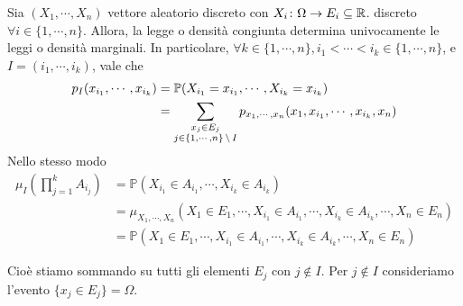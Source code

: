 \documentclass[a4paper]{article}
\begin{document}
\begin{snippetproposition}{}
    Sia \((X_1, \cdots, X_n)\)
    vettore aleatorio discreto con \(X_i \colon \Omega \to E_i \subseteq \mathbb{R}\).
    discreto \(\forall i \in \{1, \cdots, n\}\).
    Allora, la legge o densità congiunta determina univocamente
    le leggi o densità marginali.
    In particolare, \(\forall k \in \{1, \cdots, n\}, i_1 < \cdots < i_k \in \{1, \cdots, n\}\),
    e \(I = (i_1, \cdots, i_k)\),
    vale che
    \begin{align*}
        p_I(x_{i_1}, \cdots, x_{i_k})
        &= \mathbb P(X_{i_1} = x_{i_1}, \cdots, X_{i_k} = x_{i_k}) \\
        &= \sum_{\substack{x_j \in E_j \\ j \in \{1, \cdots, n\} \,\backslash\, I}}
        p_{x_1, \cdots, x_n} (x_1, x_{i_1}, \cdots, x_{i_k}, x_n)
    \end{align*}
    Nello stesso modo
    \begin{align*}
        \mu_I\left(\prod_{j=1}^k A_{i_j}\right)
        &= \mathbb P(X_{i_1} \in A_{i_1}, \cdots, X_{i_k} \in A_{i_k}) \\
        &= \mu_{X_1, \cdots, X_n}(
            X_1 \in E_1, \cdots, X_{i_1} \in A_{i_1},
            \cdots, X_{i_k} \in A_{i_k}, \cdots,
            X_n \in E_n
        ) \\
        &= \mathbb P(X_1 \in E_1, \cdots, X_{i_1} \in A_{i_1}, \cdots, X_{i_k} \in A_{i_k}, \cdots, X_n \in E_n)
    \end{align*}
\end{snippetproposition}

Cioè stiamo sommando su tutti gli elementi \(E_j\) con \(j \notin I\).
Per \(j \notin I\) consideriamo l'evento \(\{x_j \in E_j\} = \Omega\).
\end{document}
